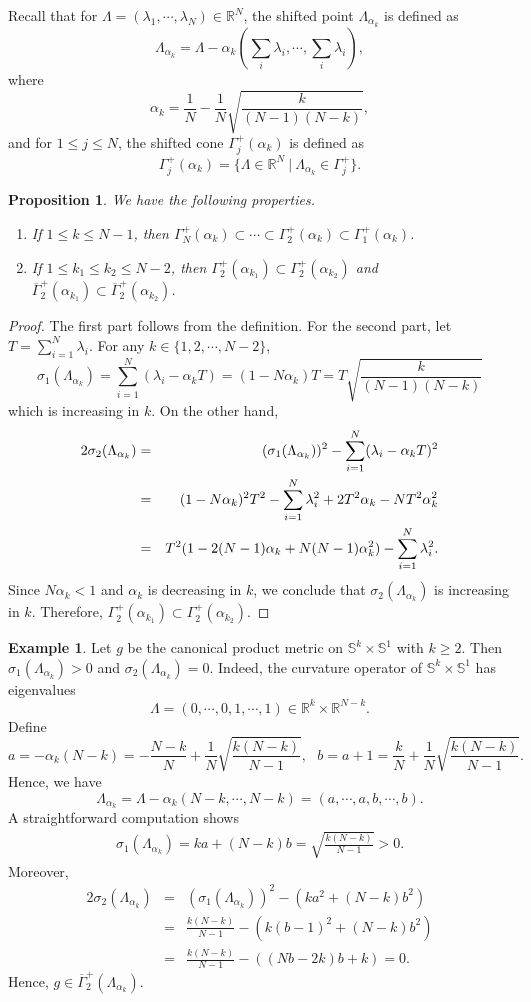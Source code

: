 \documentclass[12pt]{amsart}
\theoremstyle{plain}
\newtheorem{prop}[thm]{Proposition}
\theoremstyle{definition}
\newtheorem{example}[thm]{Example}
\newcommand{\bproposition}{\begin{prop}}
\newcommand{\eproposition}{\end{prop}}
\newcommand{\bproof}{\begin{proof}}
\newcommand{\eproof}{\end{proof}}
\newcommand{\eexample}{\end{example}}
\newcommand{\bexample}{\begin{example}}
\renewcommand{\bar}{\overline}
\newcommand{\beq}{\begin{equation}}
\newcommand{\eeq}{\end{equation}}
\newcommand{\ee}{\end{eqnarray*}}
\newcommand{\be}{\begin{eqnarray*}}
\newcommand{\bd}{\begin{enumerate}}
\newcommand{\ed}{\end{enumerate}}
\renewcommand{\S}{{\mathbb S}}
\renewcommand{\>}{\rightarrow}
\newcommand{\R}{{\mathbb R}}
\numberwithin{equation}{section} %
\begin{document}
	\baselineskip
	
	\noindent 
	Recall that for $\Lambda=(\lambda_1,\cdots, \lambda_N)\in \R^N$, the shifted point $\Lambda_{\alpha_k}$ is defined as 
	\beq \Lambda_{\alpha_k}=\Lambda-\alpha_k\left(\sum_i \lambda_i, \cdots, \sum_i \lambda_i\right), \eeq 
	where
		\beq \alpha_k=\frac{1}{N}-\frac{1}{N}\sqrt{\frac{k}{(N-1)(N-k)}},\eeq 
	and for $1\leq j\leq N$, the shifted cone $\Gamma_j^+(\alpha_k)$ is defined as 
	\beq \Gamma_j^+(\alpha_k)=\{\Lambda\in \R^N\ |\ \Lambda_{\alpha_k}\in \Gamma_j^+ \}. \eeq 
	
	\bproposition  We have the following properties.
		\bd
			\item If $1\leq k\leq N-1$, then $\Gamma_N^+(\alpha_k)\subset\cdots\subset\Gamma_2^+(\alpha_k)\subset\Gamma_1^+(\alpha_k)$.
		
			\item If $1\leq k_1\leq k_2\leq N-2$, then  $\Gamma_2^+(\alpha_{k_1})\subset \Gamma_2^+(\alpha_{k_2})$  and  $\bar \Gamma_2^+(\alpha_{k_1})\subset \bar \Gamma_2^+(\alpha_{k_2})$.
		\ed
	\eproposition
	\bproof The first part follows from  the definition. For the second part,  let $T=\sum\limits_{i=1}^N\lambda_i$. For any $k\in\{1,2,\cdots,N-2\}$, 
$$\sigma_1(\Lambda_{\alpha_k})=\sum_{i=1}^N(\lambda_i-\alpha_kT)=(1-N\alpha_k)T=T\sqrt{\frac{k}{(N-1)(N-k)}}$$
	which is increasing in $k$. On the other hand, 
\be 	2\sigma_2(\Lambda_{\alpha_k})&=&(\sigma_1(\Lambda_{\alpha_k}))^2-\sum_{i=1}^N(\lambda_i-\alpha_k T)^2\notag\\
		&=&(1-N\alpha_k)^2T^2-\sum_{i=1}^N\lambda_i^2+2T^2\alpha_k-NT^2\alpha_k^2\notag\\
		&=&T^2(1-2(N-1)\alpha_k+N(N-1)\alpha_k^2)-\sum_{i=1}^N\lambda_i^2.
\ee
Since $N\alpha_k<1$ and $\alpha_k$ is decreasing in $k$, we conclude that $\sigma_2(\Lambda_{\alpha_k})$ is increasing in $k$. Therefore, $\Gamma_2^+(\alpha_{k_1})\subset \Gamma_2^+(\alpha_{k_2})$.
	\eproof 
	
	
	
	\bexample\label{examplek}  Let $g$ be the canonical product metric on $\S^k\times \S^1$ with $k\geq 2$. Then $\sigma_1(\Lambda_{\alpha_k})>0$ and $\sigma_2(\Lambda_{\alpha_k})=0$. Indeed, the curvature operator of $\S^k\times \S^1$ has eigenvalues
	$$\Lambda=(0,\cdots, 0, 1, \cdots, 1)\in \R^k\times \R^{N-k}.$$
Define 
$$a=-\alpha_k(N-k)=-\frac{N-k}{N}+\frac{1}{N}\sqrt{\frac{k(N-k)}{N-1}},\ \ \ b=a+1=\frac{k}{N}+\frac{1}{N}\sqrt{\frac{k(N-k)}{N-1}}.$$ Hence, we have  $$\Lambda_{\alpha_k}=\Lambda-\alpha_k (N-k,\cdots, N-k)=(a,\cdots,a,b,\cdots,b).$$ A straightforward computation shows
\begin{eqnarray*}
	\sigma_1(\Lambda_{\alpha_k})=ka+(N-k)b=\sqrt{\frac{k(N-k)}{N-1}}>0.
\end{eqnarray*}
Moreover, 
\begin{eqnarray*}
	2\sigma_2(\Lambda_{\alpha_k})&=&\left(\sigma_1(\Lambda_{\alpha_k})\right)^2-\left(ka^2+(N-k)b^2\right)\\
	&=&\frac{k(N-k)}{N-1}-(k(b-1)^2+(N-k)b^2)\\
	&=&\frac{k(N-k)}{N-1}-\left((Nb-2k)b+k\right)=0.
\end{eqnarray*}	
	Hence, $g\in \bar\Gamma_2^+(\Lambda_{\alpha_k})$.
	\eexample 
	
\end{document}
